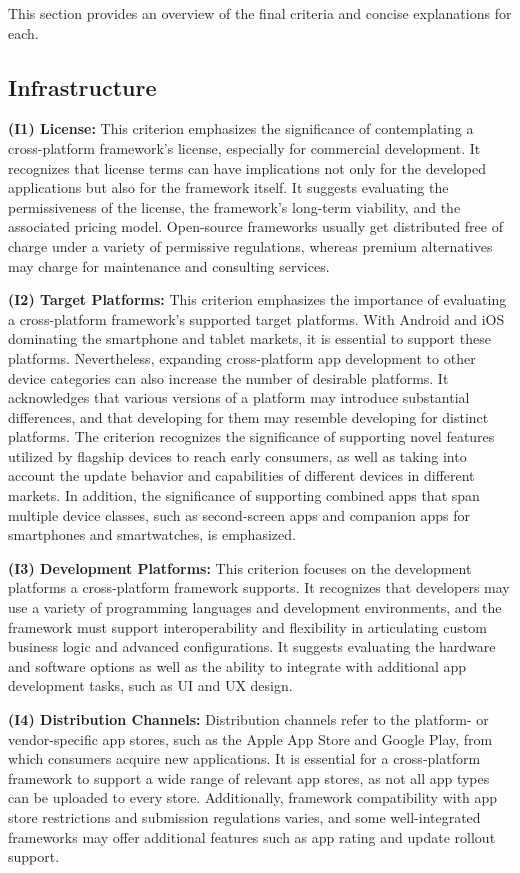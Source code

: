 
This section provides an overview of the final criteria and concise explanations for each.

\subsection{Infrastructure}
\textbf{(I1) License:}
This criterion emphasizes the significance of contemplating a cross-platform framework's license, especially for commercial development. It recognizes that license terms can have implications not only for the developed applications but also for the framework itself. It suggests evaluating the permissiveness of the license, the framework's long-term viability, and the associated pricing model. Open-source frameworks usually get distributed free of charge under a variety of permissive regulations, whereas premium alternatives may charge for maintenance and consulting services.

\textbf{(I2) Target Platforms:} 
This criterion emphasizes the importance of evaluating a cross-platform framework's supported target platforms. With Android and iOS dominating the smartphone and tablet markets, it is essential to support these platforms. Nevertheless, expanding cross-platform app development to other device categories can also increase the number of desirable platforms. It acknowledges that various versions of a platform may introduce substantial differences, and that developing for them may resemble developing for distinct platforms. The criterion recognizes the significance of supporting novel features utilized by flagship devices to reach early consumers, as well as taking into account the update behavior and capabilities of different devices in different markets. In addition, the significance of supporting combined apps that span multiple device classes, such as second-screen apps and companion apps for smartphones and smartwatches, is emphasized.

\textbf{(I3) Development Platforms:} 
This criterion focuses on the development platforms a cross-platform framework supports. It recognizes that developers may use a variety of programming languages and development environments, and the framework must support interoperability and flexibility in articulating custom business logic and advanced configurations. It suggests evaluating the hardware and software options as well as the ability to integrate with additional app development tasks, such as UI and UX design.

\textbf{(I4) Distribution Channels:} 
Distribution channels refer to the platform- or vendor-specific app stores, such as the Apple App Store and Google Play, from which consumers acquire new applications. It is essential for a cross-platform framework to support a wide range of relevant app stores, as not all app types can be uploaded to every store. Additionally, framework compatibility with app store restrictions and submission regulations varies, and some well-integrated frameworks may offer additional features such as app rating and update rollout support.

